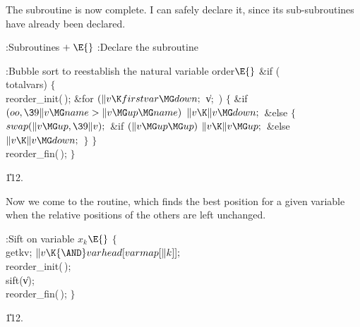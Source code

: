 The  subroutine is now complete. I can safely
declare it,
since its sub-subroutines have already been declared.

\Y\B\4:Subroutines\X${}\mathrel+\E{}$\6
:Declare the  subroutine\X\par
\fi

\B{}:Bubble sort to reestablish the natural variable
order\X${}\E{}$\6
\&{if} (\\{totalvars})\5
${}\{{}$\1\6
\\{reorder\_init}(\,);\6
\&{for} ${}(\|v\K\\{firstvar}\MG\\{down};{}$ \|v; \,)\5
${}\{{}$\1\6
\&{if} ${}(\\{oo},\39\|v\MG\\{name}>\|v\MG\\{up}\MG\\{name}){}$\1\5
${}\|v\K\|v\MG\\{down};{}$\2\6
\&{else}\5
${}\{{}$\1\6
${}\\{swap}(\|v\MG\\{up},\39\|v);{}$\6
\&{if} ${}(\|v\MG\\{up}\MG\\{up}){}$\1\5
${}\|v\K\|v\MG\\{up};{}$\2\6
\&{else}\1\5
${}\|v\K\|v\MG\\{down};{}$\2\6
\4${}\}{}$\2\6
\4${}\}{}$\2\6
\\{reorder\_fin}(\,);\6
\4${}\}{}$\2\par
\U112.\fi

Now we come to the  routine, which finds the
best position
for a given variable when the relative positions of the others
are left unchanged.

\Y\B\4:Sift on variable $x_k$\X${}\E{}$\6
${}\{{}$\1\6
\\{getkv};\5
${}\|v\K{\AND}\\{varhead}[\\{varmap}[\|k]];{}$\6
\\{reorder\_init}(\,);\6
\\{sift}(\|v);\6
\\{reorder\_fin}(\,);\6
\4${}\}{}$\2\par
\U112.\fi

